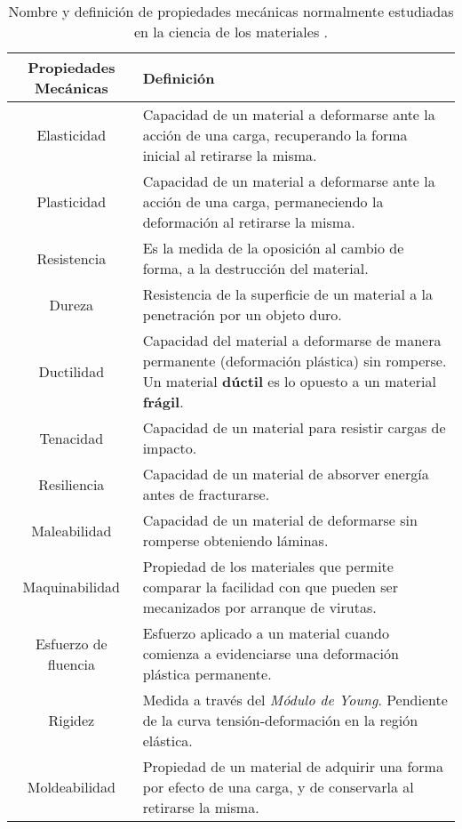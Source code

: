 \begin{table}[htp]
\caption[Nombre y definición de propiedades mecánicas.]{Nombre y definición de propiedades mecánicas normalmente estudiadas en la ciencia de los materiales
\cite{askeland98}.}
\begin{center}
\begin{tabular}{c C{10cm}}
\hline
\textbf{Propiedades Mecánicas} & \textbf{Definición} \\ \hline
 \hline

Elasticidad &
Capacidad de un material a deformarse ante la acción de una carga, recuperando la forma inicial al retirarse la misma. \\ \hline
 
Plasticidad &
Capacidad de un material a deformarse ante la acción de una carga, permaneciendo la deformación al retirarse la misma. \\ \hline 
 
Resistencia & 
Es la medida de la oposición al cambio de forma, a la destrucción del material. \\ \hline

Dureza & 
Resistencia de la superficie de un material a la penetración por un objeto duro.\\ \hline

Ductilidad & 
Capacidad del material a deformarse de manera permanente (deformación plástica) sin romperse. Un material \textbf{dúctil} es lo opuesto a un material \textbf{frágil}. \\ \hline

Tenacidad & 
Capacidad de un material para resistir cargas de impacto. \\ \hline

Resiliencia &
Capacidad de un material de absorver energía antes de fracturarse. \\ \hline

Maleabilidad & 
Capacidad de un material de deformarse sin romperse obteniendo láminas. \\ \hline

Maquinabilidad &
Propiedad de los materiales que permite comparar la facilidad con que pueden ser mecanizados por arranque de virutas. \\ \hline

Esfuerzo de fluencia & 
Esfuerzo aplicado a un material cuando comienza a evidenciarse una deformación plástica permanente.\\ \hline

Rigidez & 
Medida a través del \textit{Módulo de Young}. Pendiente de la curva tensión-deformación en la región elástica. \\ \hline

Moldeabilidad &
Propiedad de un material de adquirir una forma por efecto de una carga, y de conservarla al retirarse la misma. \\ \hline

\end{tabular}
\end{center}
\label{C1:tbl:propiedades}
\end{table}

